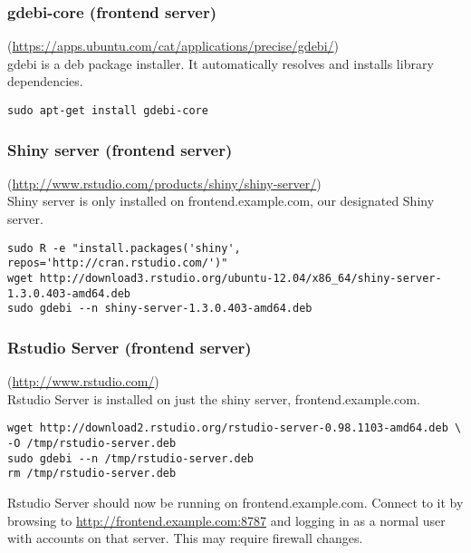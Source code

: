 \subsubsection{gdebi-core (frontend server)}(\url{https://apps.ubuntu.com/cat/applications/precise/gdebi/})\\
gdebi is a deb package installer. It automatically resolves and installs library dependencies.
\begin{verbatim}
sudo apt-get install gdebi-core
\end{verbatim}

\subsubsection{Shiny server (frontend server)}(\url{http://www.rstudio.com/products/shiny/shiny-server/})\\

Shiny server is only installed on frontend.example.com, our designated Shiny server.

\begin{verbatim}
sudo R -e "install.packages('shiny', repos='http://cran.rstudio.com/')"
wget http://download3.rstudio.org/ubuntu-12.04/x86_64/shiny-server-1.3.0.403-amd64.deb
sudo gdebi --n shiny-server-1.3.0.403-amd64.deb
\end{verbatim}

\subsubsection{Rstudio Server (frontend server)}(\url{http://www.rstudio.com/})\\
Rstudio Server is installed on just the shiny server, frontend.example.com.
\begin{verbatim}
wget http://download2.rstudio.org/rstudio-server-0.98.1103-amd64.deb \
-O /tmp/rstudio-server.deb
sudo gdebi --n /tmp/rstudio-server.deb
rm /tmp/rstudio-server.deb
\end{verbatim}

Rstudio Server should now be running on frontend.example.com.  Connect to
it by browsing to \url{http://frontend.example.com:8787} and logging in as a
normal user with accounts on that server.  This may require firewall changes.
